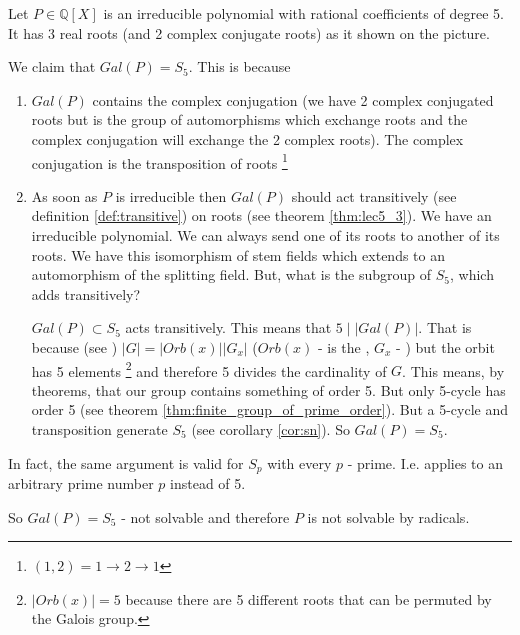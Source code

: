 \begin{example}
  Let $P \in \mathbb{Q}\left[X\right]$ is an irreducible polynomial
  with rational 
  coefficients of degree 5. It has 3 real roots (and 2 complex
  conjugate roots) as it shown on the picture.
  

  We claim that $Gal\left(P\right) = S_5$. This is because
  \begin{enumerate}
    \item $Gal\left(P\right)$ contains the complex conjugation (we
      have 2 complex conjugated roots but  is
      the group of automorphisms which exchange roots and the complex
      conjugation will exchange the 2 complex roots).
      The complex conjugation is the transposition of roots
      \footnote{
        $(1,2) = 1 \to 2 \to 1$
      }
    \item As soon as $P$ is irreducible then $Gal\left(P\right)$
      should act transitively (see definition \ref{def:transitive}) on
      roots (see theorem \ref{thm:lec5_3}). We have an irreducible
      polynomial. We can always send 
      one of its roots to another of its roots. We have this
      isomorphism of stem fields which extends to an automorphism of
      the splitting field. But, what is the subgroup of $S_5$, which adds
      transitively?

      $Gal\left(P\right) \subset S_5$ acts transitively. This means
      that $5 \mid \left|Gal\left(P\right)\right|$. That is because
      (see )
      $\left|G\right| = \left|Orb\left(x\right)\right| \left|G_x\right|$
      ($Orb\left(x\right)$ - is the ,
      $G_x$ - )
      but the orbit has 5 elements
      \footnote{
        $\left|Orb\left(x\right)\right| = 5$ because there are 5
        different roots that can be permuted by the Galois group.
      }
      and therefore 5 divides
      the cardinality of $G$. This means, by  
      theorems, that our group contains something of order 5. But only
      5-cycle has order 5 (see theorem
      \ref{thm:finite_group_of_prime_order}). 
      But a 5-cycle and transposition generate
      $S_5$ (see corollary \ref{cor:sn}).
      So $Gal\left(P\right) = S_5$.
  \end{enumerate}
  In fact, the same argument is valid for $S_p$ with every $p$ - prime. 
  I.e. applies to an arbitrary prime number $p$ instead of 5.

  So $Gal\left(P\right) = S_5$ - not solvable and therefore $P$ is not
  solvable by radicals.
  \label{ex:lec8_notsolvable1}
\end{example}

